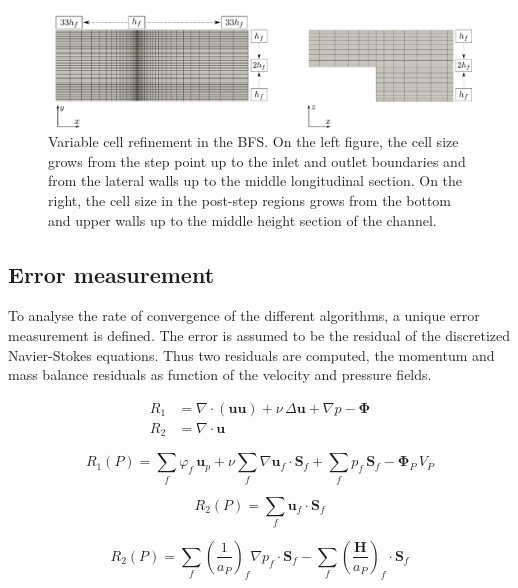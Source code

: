 \documentclass[final,3p,times,10pt,onecolumn]{myElsarticle}
\numberwithin{equation}{section}
\begin{document}
\begin{figure}[t!!!]
\centering
\includegraphics[width=16cm]{fig/Cases/Factores.pdf}
\caption{Variable cell refinement in the BFS.  On the left figure, the cell size grows from the step point up to the inlet and outlet boundaries and from the lateral walls up to the middle longitudinal section. On the right, the cell size in the post-step regions grows from the bottom and upper walls up to the middle height section of the channel.}
\label{Fig:Factores}
\end{figure}

\subsection{Error measurement}
To analyse the rate of convergence of the different algorithms, a unique error measurement is defined. The error is assumed to be the residual of the discretized Navier-Stokes equations. Thus two residuals are computed, the momentum and mass balance residuals as function of the velocity and pressure fields. 

\begin{align}
R_1
&=
\nabla
\cdot
\left(
\boldsymbol{u}
\boldsymbol{u}
\right)
+
\nu\, \Delta \boldsymbol{u}
+
\nabla p 
-
\boldsymbol{\Phi}
\\
R_2
&=
\nabla
\cdot
\boldsymbol{u}
\end{align}

\begin{equation}
R_1(P)
=
\sum_{f}
\varphi_f\,
\boldsymbol{u}_p
+
\nu
\sum_f
\nabla \boldsymbol{u}_f
\cdot
\boldsymbol{S}_f
+
\sum_f
p_f
\,
\boldsymbol{S}_f
-
\boldsymbol{\Phi}_P \, V_P
\end{equation}

\begin{equation}
R_2(P)
=
\sum_f
\boldsymbol{u}_f
\cdot
\boldsymbol{S}_f
\end{equation}

\begin{equation}
R_2(P)
=
\sum_f 
\left(
\frac{1}{a_P}
\right)_f 
\nabla p_f
\cdot
\boldsymbol{S}_f 
-
\sum_f
\left(
\frac{\boldsymbol{H}}
{a_P}
\right)_f 
\cdot 
\boldsymbol{S}_f 
\end{equation}
\end{document}

